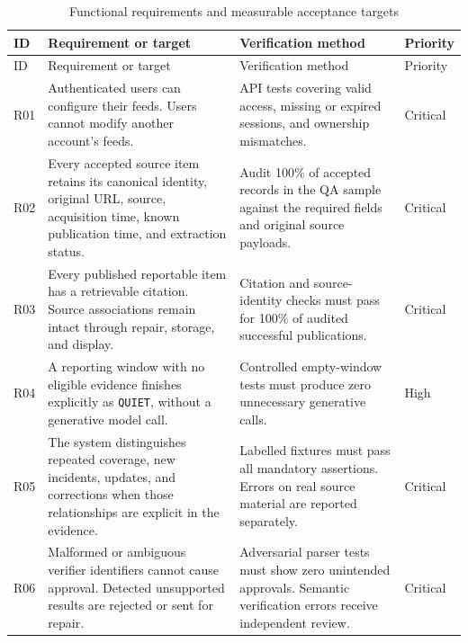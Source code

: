 \begingroup
\small
\setlength{\tabcolsep}{4pt}
\begin{longtable}{
    p{}
    p{}
    p{}
    p{}
}
\caption{Functional requirements and measurable acceptance targets}
\label{tab:reqs}\\
\toprule
ID & Requirement or target & Verification method & Priority \\
\midrule
\endfirsthead

\toprule
ID & Requirement or target & Verification method & Priority \\
\midrule
\endhead

\bottomrule
\endfoot

R01
& Authenticated users can configure their feeds. Users cannot modify another account's feeds.
& API tests covering valid access, missing or expired sessions, and ownership mismatches.
& Critical \\

R02
& Every accepted source item retains its canonical identity, original URL, source, acquisition time, known publication time, and extraction status.
& Audit 100\% of accepted records in the QA sample against the required fields and original source payloads.
& Critical \\

R03
& Every published reportable item has a retrievable citation. Source associations remain intact through repair, storage, and display.
& Citation and source-identity checks must pass for 100\% of audited successful publications.
& Critical \\

R04
& A reporting window with no eligible evidence finishes explicitly as \texttt{QUIET}, without a generative model call.
& Controlled empty-window tests must produce zero unnecessary generative calls.
& High \\

R05
& The system distinguishes repeated coverage, new incidents, updates, and corrections when those relationships are explicit in the evidence.
& Labelled fixtures must pass all mandatory assertions. Errors on real source material are reported separately.
& Critical \\

R06
& Malformed or ambiguous verifier identifiers cannot cause approval. Detected unsupported results are rejected or sent for repair.
& Adversarial parser tests must show zero unintended approvals. Semantic verification errors receive independent review.
& Critical \\


\end{longtable}

